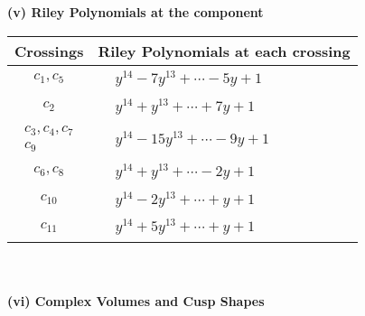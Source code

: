 \documentclass[1p]{elsarticle_modified}
\theoremstyle{definition}
\begin{document}
\newpage\renewcommand{\arraystretch}{1}
\flushleft \textbf{(v) Riley Polynomials at the component}\newline \\
\begin{tabular}{m{50pt}|m{274pt}}
Crossings & \hspace{64pt}Riley Polynomials at each crossing \\
\hline $$\begin{aligned}c_{1},c_{5}\end{aligned}$$&$\begin{aligned}
&y^{14}-7 y^{13}+\cdots-5 y+1
\end{aligned}$\\
\hline $$\begin{aligned}c_{2}\end{aligned}$$&$\begin{aligned}
&y^{14}+y^{13}+\cdots+7 y+1
\end{aligned}$\\
\hline $$\begin{aligned}c_{3},c_{4},c_{7}\\c_{9}\end{aligned}$$&$\begin{aligned}
&y^{14}-15 y^{13}+\cdots-9 y+1
\end{aligned}$\\
\hline $$\begin{aligned}c_{6},c_{8}\end{aligned}$$&$\begin{aligned}
&y^{14}+y^{13}+\cdots-2 y+1
\end{aligned}$\\
\hline $$\begin{aligned}c_{10}\end{aligned}$$&$\begin{aligned}
&y^{14}-2 y^{13}+\cdots+y+1
\end{aligned}$\\
\hline $$\begin{aligned}c_{11}\end{aligned}$$&$\begin{aligned}
&y^{14}+5 y^{13}+\cdots+y+1
\end{aligned}$\\
\hline
\end{tabular}\\~\\
\newpage\flushleft \textbf{(vi) Complex Volumes and Cusp Shapes}
\end{document}
